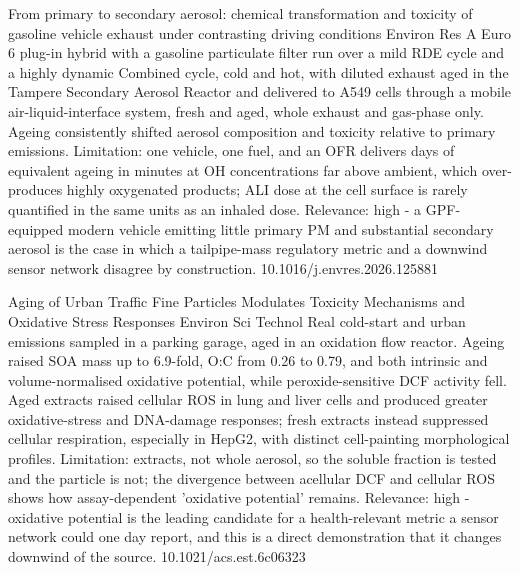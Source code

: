 \documentclass[10pt]{article}
\begin{document}
{From primary to secondary aerosol: chemical transformation and toxicity of gasoline vehicle exhaust under contrasting driving conditions}
{Environ Res}
{A Euro 6 plug-in hybrid with a gasoline particulate filter run over a mild RDE cycle and a highly dynamic Combined cycle, cold and hot, with diluted exhaust aged in the Tampere Secondary Aerosol Reactor and delivered to A549 cells through a mobile air-liquid-interface system, fresh and aged, whole exhaust and gas-phase only. Ageing consistently shifted aerosol composition and toxicity relative to primary emissions. Limitation: one vehicle, one fuel, and an OFR delivers days of equivalent ageing in minutes at OH concentrations far above ambient, which over-produces highly oxygenated products; ALI dose at the cell surface is rarely quantified in the same units as an inhaled dose. Relevance: high - a GPF-equipped modern vehicle emitting little primary PM and substantial secondary aerosol is the case in which a tailpipe-mass regulatory metric and a downwind sensor network disagree by construction.}
{10.1016/j.envres.2026.125881}

{Aging of Urban Traffic Fine Particles Modulates Toxicity Mechanisms and Oxidative Stress Responses}
{Environ Sci Technol}
{Real cold-start and urban emissions sampled in a parking garage, aged in an oxidation flow reactor. Ageing raised SOA mass up to 6.9-fold, O:C from 0.26 to 0.79, and both intrinsic and volume-normalised oxidative potential, while peroxide-sensitive DCF activity fell. Aged extracts raised cellular ROS in lung and liver cells and produced greater oxidative-stress and DNA-damage responses; fresh extracts instead suppressed cellular respiration, especially in HepG2, with distinct cell-painting morphological profiles. Limitation: extracts, not whole aerosol, so the soluble fraction is tested and the particle is not; the divergence between acellular DCF and cellular ROS shows how assay-dependent 'oxidative potential' remains. Relevance: high - oxidative potential is the leading candidate for a health-relevant metric a sensor network could one day report, and this is a direct demonstration that it changes downwind of the source.}
{10.1021/acs.est.6c06323}

\par{}\baselineskip{}\baselineskip
{}
\end{document}
